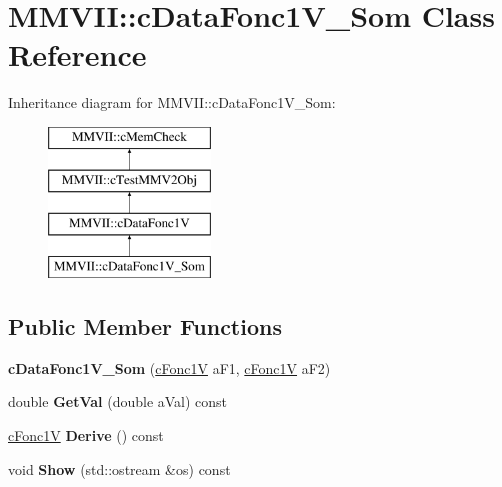 \hypertarget{classMMVII_1_1cDataFonc1V__Som}{}\section{M\+M\+V\+II\+:\+:c\+Data\+Fonc1\+V\+\_\+\+Som Class Reference}
\label{classMMVII_1_1cDataFonc1V__Som}
Inheritance diagram for M\+M\+V\+II\+:\+:c\+Data\+Fonc1\+V\+\_\+\+Som\+:\begin{figure}[H]
\begin{center}
\leavevmode
\includegraphics[height=4.000000cm]{classMMVII_1_1cDataFonc1V__Som}
\end{center}
\end{figure}
\subsection*{Public Member Functions}
\begin{DoxyCompactItemize}
\item 
{\bfseries c\+Data\+Fonc1\+V\+\_\+\+Som} (\hyperlink{classMMVII_1_1cFonc1V}{c\+Fonc1V} a\+F1, \hyperlink{classMMVII_1_1cFonc1V}{c\+Fonc1V} a\+F2)\hypertarget{classMMVII_1_1cDataFonc1V__Som_acc85ec6ee2f12ebb60e5e5cb91df57f0}{}\label{classMMVII_1_1cDataFonc1V__Som_acc85ec6ee2f12ebb60e5e5cb91df57f0}

\item 
double {\bfseries Get\+Val} (double a\+Val) const \hypertarget{classMMVII_1_1cDataFonc1V__Som_a50e8a6eb8e2b8c333aa121ff58a533f8}{}\label{classMMVII_1_1cDataFonc1V__Som_a50e8a6eb8e2b8c333aa121ff58a533f8}

\item 
\hyperlink{classMMVII_1_1cFonc1V}{c\+Fonc1V} {\bfseries Derive} () const \hypertarget{classMMVII_1_1cDataFonc1V__Som_a027f57bf7b0123f7e74d9ba433ec2f7c}{}\label{classMMVII_1_1cDataFonc1V__Som_a027f57bf7b0123f7e74d9ba433ec2f7c}

\item 
void {\bfseries Show} (std\+::ostream \&os) const \hypertarget{classMMVII_1_1cDataFonc1V__Som_af97a8455c64dd299c1d409105d7cac63}{}\label{classMMVII_1_1cDataFonc1V__Som_af97a8455c64dd299c1d409105d7cac63}

\end{DoxyCompactItemize}
